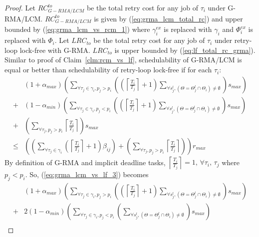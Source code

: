 \begin{proof}\normalfont
%
Let $RC_{G-RMA/LCM}^{to}$ be the total retry cost for any job of $\tau_i$ under G-RMA/LCM. $RC_{G-RMA/LCM}^{to}$ is given by (\ref{eq:grma_lcm_total_rc}) and upper bounded by (\ref{eq:grma_lcm_vs_rcm_1}) where $\gamma_i^{ex}$ is replaced with $\gamma_i$ and $\Phi_i^{ex}$ is replaced with $\Phi_i$. Let $LRC_{to}$ be the total retry cost for any job of $\tau_i$ under retry-loop lock-free with G-RMA. $LRC_{to}$ is upper bounded by (\ref{eq:lf_total_rc_grma}). Similar to proof of Claim~\ref{clm:rcm_vs_lf}, schedulability of G-RMA/LCM is equal or better than schedulability of retry-loop lock-free if for each $\tau_i$:
\begin{eqnarray}
 & \left(1+\alpha_{max}\right)\left(\sum_{\forall\tau_{j}\in\gamma_{i},p_{j}>p_{i}}\left(\left(\left\lceil \frac{T_{i}}{T_{j}}\right\rceil +1\right)\sum_{\forall s_{j}^{l},\left(\Theta=\Theta_{j}^{l}\cap\Theta_{i}\right)\neq\emptyset}\right)s_{max}\right)\nonumber \\
+ & \left(1-\alpha_{min}\right)\left(\sum_{\forall\tau_{j}\in\gamma_{i},p_{j}<p_{i}}\left(\left(\left\lceil \frac{T_{i}}{T_{j}}\right\rceil +1\right)\sum_{\forall s_{j}^{l},\left(\Theta=\Theta_{j}^{l}\cap\Theta_{i}\right)\neq\emptyset}\right)s_{max}\right)\nonumber \\
+ & \left(\sum_{\forall\tau_{j},p_{j}>p_{i}}\left\lceil \frac{T_{i}}{T_{j}}\right\rceil \right)s_{max}\nonumber \\
\le & \left(\left(\sum_{\forall\tau_{j}\in\gamma_{i}}\left(\left\lceil \frac{T_{i}}{T_{j}}\right\rceil +1\right)\beta_{ij}\right)+\left(\sum_{\forall\tau_{j},p_{j}>p_{i}}\left\lceil \frac{T_{i}}{T_{j}}\right\rceil \right)\right)r_{max}\label{eq:grma_lcm_vs_lf_3}
\end{eqnarray}
%
By definition of G-RMA and implicit deadline tasks, $\left\lceil \frac{T_{i}}{T_{j}}\right\rceil =1,\,\forall\tau_{i},\,\tau_{j}$
where $p_{j}<p_{i}$. So, (\ref{eq:grma_lcm_vs_lf_3}) becomes 
%
\begin{eqnarray}
 & \left(1+\alpha_{max}\right)\left(\sum_{\forall\tau_{j}\in\gamma_{i},p_{j}>p_{i}}\left(\left(\left\lceil \frac{T_{i}}{T_{j}}\right\rceil +1\right)\sum_{\forall s_{j}^{l},\left(\Theta=\Theta_{j}^{l}\cap\Theta_{i}\right)\neq\emptyset}\right)s_{max}\right)\nonumber \\
+ & 2\left(1-\alpha_{min}\right)\left(\sum_{\forall\tau_{j}\in\gamma_{i},p_{j}<p_{i}}\left(\sum_{\forall s_{j}^{l},\left(\Theta=\Theta_{j}^{l}\cap\Theta_{i}\right)\neq\emptyset}\right)s_{max}\right)\nonumber \\

\end{eqnarray}
\end{proof}
